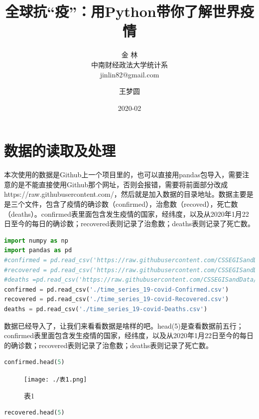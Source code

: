 \documentclass[UTF8,a4paper,12pt]{ctexart}  %
\author{\CJKfamily{kai} 金 \enspace 林 \\ \CJKfamily{kai} 中南财经政法大学统计系 \\ jinlin82@gmail.com}
\title{\LARGE\textbf{全球抗``疫''：用Python带你了解世界疫情}}
\author{王梦圆}
\date{2020-02}
\begin{document}
\maketitle

\section{数据的读取及处理}

本次使用的数据是Github上一个项目里的，也可以直接用pandas包导入，需要注意的是不能直接使用Github那个网址，否则会报错，需要将前面部分改成https://raw.githubusercontent.com/，然后就是加入数据的目录地址。数据主要是是三个文件，包含了疫情的确诊数（confirmed），治愈数（recoved），死亡数（deaths）。confirmed表里面包含发生疫情的国家，经纬度，以及从2020年1月22日至今的每日的确诊数；recovered表则记录了治愈数；deaths表则记录了死亡数。

\begin{lstlisting}[language=Python]
import numpy as np
import pandas as pd
#confirmed = pd.read_csv('https://raw.githubusercontent.com/CSSEGISandData/COVID-19/master/csse_covid_19_data/csse_covid_19_time_series/time_series_19-covid-Confirmed.csv')
#recovered = pd.read_csv('https://raw.githubusercontent.com/CSSEGISandData/COVID-19/master/csse_covid_19_data/csse_covid_19_time_series/time_series_19-covid-Recovered.csv')
#deaths =pd.read_csv('https://raw.githubusercontent.com/CSSEGISandData/COVID-19/master/csse_covid_19_data/csse_covid_19_time_series/time_series_19-covid-Deaths.csv')
confirmed = pd.read_csv('./time_series_19-covid-Confirmed.csv')
recovered = pd.read_csv('./time_series_19-covid-Recovered.csv')
deaths = pd.read_csv('./time_series_19-covid-Deaths.csv')
\end{lstlisting}

数据已经导入了，让我们来看看数据是啥样的吧。head(5)是查看数据前五行；confirmed表里面包含发生疫情的国家，经纬度，以及从2020年1月22日至今的每日的确诊数；recovered表则记录了治愈数；deaths表则记录了死亡数。

\begin{lstlisting}[language=Python]
confirmed.head(5)
\end{lstlisting}

\begin{figure}
\centering
\texttt{[image: ./表1.png]}
\caption{表1}
\end{figure}

\begin{lstlisting}[language=Python]
recovered.head(5)
\end{lstlisting}
\end{document}
